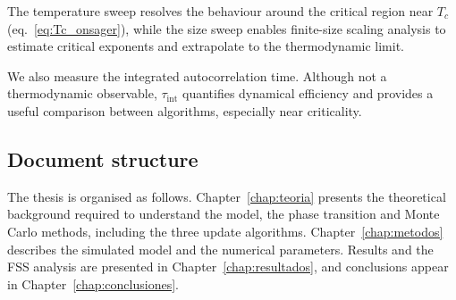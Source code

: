 The temperature sweep resolves the behaviour around the critical region near $T_c$ (eq.~\ref{eq:Tc_onsager}), while the size sweep enables finite-size scaling analysis to estimate critical exponents and extrapolate to the thermodynamic limit.

We also measure the integrated autocorrelation time. Although not a thermodynamic observable, $\tau_{\mathrm{int}}$ quantifies dynamical efficiency and provides a useful comparison between algorithms, especially near criticality.

\subsection*{Document structure}
The thesis is organised as follows. Chapter~\ref{chap:teoria} presents the theoretical background required to understand the model, the phase transition and Monte Carlo methods, including the three update algorithms. Chapter~\ref{chap:metodos} describes the simulated model and the numerical parameters. Results and the FSS analysis are presented in Chapter~\ref{chap:resultados}, and conclusions appear in Chapter~\ref{chap:conclusiones}.
